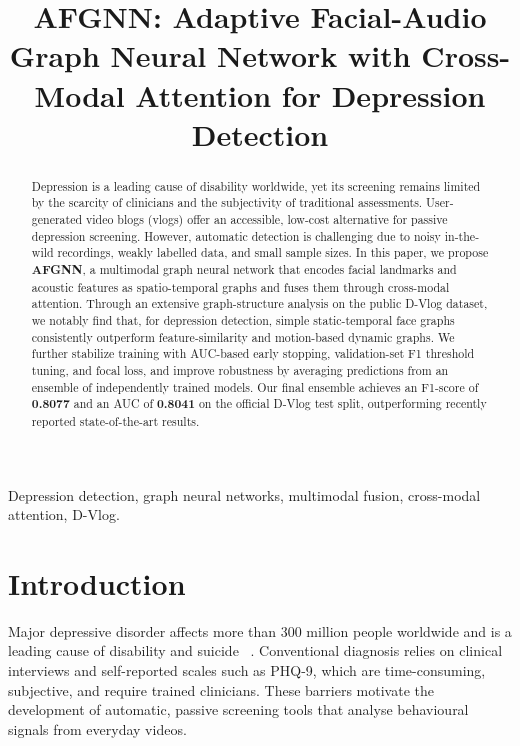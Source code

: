 \documentclass[conference]{IEEEtran}
\begin{document}
\title{AFGNN: Adaptive Facial-Audio Graph Neural Network with Cross-Modal Attention for Depression Detection}

\author{
}

\maketitle

\begin{abstract}
Depression is a leading cause of disability worldwide, yet its screening remains limited by the scarcity of clinicians and the subjectivity of traditional assessments.
User-generated video blogs (vlogs) offer an accessible, low-cost alternative for passive depression screening.
However, automatic detection is challenging due to noisy in-the-wild recordings, weakly labelled data, and small sample sizes.
In this paper, we propose \textbf{AFGNN}, a multimodal graph neural network that encodes facial landmarks and acoustic features as spatio-temporal graphs and fuses them through cross-modal attention.
Through an extensive graph-structure analysis on the public D-Vlog dataset, we notably find that, for depression detection, simple static-temporal face graphs consistently outperform feature-similarity and motion-based dynamic graphs.
We further stabilize training with AUC-based early stopping, validation-set F1 threshold tuning, and focal loss, and improve robustness by averaging predictions from an ensemble of independently trained models.
Our final ensemble achieves an F1-score of \textbf{0.8077} and an AUC of \textbf{0.8041} on the official D-Vlog test split, outperforming recently reported state-of-the-art results.
\end{abstract}

\begin{IEEEkeywords}
Depression detection, graph neural networks, multimodal fusion, cross-modal attention, D-Vlog.
\end{IEEEkeywords}

\section{Introduction}
\label{sec:intro}

Major depressive disorder affects more than 300 million people worldwide and is a leading cause of disability and suicide~
\cite{yoon2022dvlog}.
Conventional diagnosis relies on clinical interviews and self-reported scales such as PHQ-9, which are time-consuming, subjective, and require trained clinicians.
These barriers motivate the development of automatic, passive screening tools that analyse behavioural signals from everyday videos.
\end{document}

